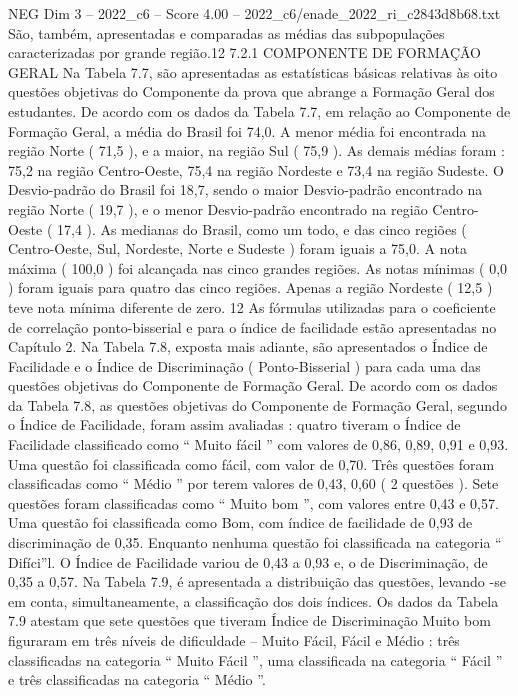 \begin{textsample}{NEG Dim 3 – 2022\_c6 – Score 4.00 – 2022\_c6/enade\_2022\_ri\_c2843d8b68.txt}
São, também, apresentadas e comparadas as médias das subpopulações caracterizadas por grande região.12 7.2.1 COMPONENTE DE FORMAÇÃO GERAL Na Tabela 7.7, são apresentadas as estatísticas básicas relativas às oito questões objetivas do Componente da prova que abrange a Formação Geral dos estudantes.
De acordo com os dados da Tabela 7.7, em relação ao Componente de Formação Geral, a média do Brasil foi 74,0.
A menor média foi encontrada na região Norte ( 71,5 ), e a maior, na região Sul ( 75,9 ).
As demais médias foram : 75,2 na região Centro-Oeste, 75,4 na região Nordeste e 73,4 na região Sudeste.
O Desvio-padrão do Brasil foi 18,7, sendo o maior Desvio-padrão encontrado na região Norte ( 19,7 ), e o menor Desvio-padrão encontrado na região Centro-Oeste ( 17,4 ).
As medianas do Brasil, como um todo, e das cinco regiões ( Centro-Oeste, Sul, Nordeste, Norte e Sudeste ) foram iguais a 75,0.
A nota máxima ( 100,0 ) foi alcançada nas cinco grandes regiões.
As notas mínimas ( 0,0 ) foram iguais para quatro das cinco regiões.
Apenas a região Nordeste ( 12,5 ) teve nota mínima diferente de zero. 12 As fórmulas utilizadas para o coeficiente de correlação ponto-bisserial e para o índice de facilidade estão apresentadas no Capítulo 2.
Na Tabela 7.8, exposta mais adiante, são apresentados o Índice de Facilidade e o Índice de Discriminação ( Ponto-Bisserial ) para cada uma das questões objetivas do Componente de Formação Geral.
De acordo com os dados da Tabela 7.8, as questões objetivas do Componente de Formação Geral, segundo o Índice de Facilidade, foram assim avaliadas : quatro tiveram o Índice de Facilidade classificado como “ Muito fácil ” com valores de 0,86, 0,89, 0,91 e 0,93.
Uma questão foi classificada como fácil, com valor de 0,70.
Três questões foram classificadas como “ Médio ” por terem valores de 0,43, 0,60 ( 2 questões ).
Sete questões foram classificadas como “ Muito bom ”, com valores entre 0,43 e 0,57.
Uma questão foi classificada como Bom, com índice de facilidade de 0,93 de discriminação de 0,35.
Enquanto nenhuma questão foi classificada na categoria “ Difíci”l.
O Índice de Facilidade variou de 0,43 a 0,93 e, o de Discriminação, de 0,35 a 0,57.
Na Tabela 7.9, é apresentada a distribuição das questões, levando -se em conta, simultaneamente, a classificação dos dois índices.
Os dados da Tabela 7.9 atestam que sete questões que tiveram Índice de Discriminação Muito bom figuraram em três níveis de dificuldade – Muito Fácil, Fácil e Médio : três classificadas na categoria “ Muito Fácil ”, uma classificada na categoria “ Fácil ” e três classificadas na categoria “ Médio ”.

\end{textsample}

